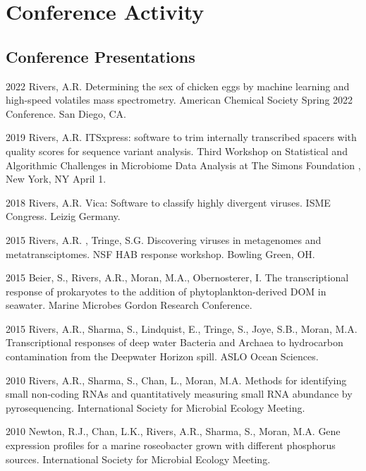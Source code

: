 \documentclass[12pt,letterpaper]{report}
\begin{document}
  
    \section*{Conference Activity}


    \subsection*{Conference Presentations}

    \begin{tablist}

    
\item[2022 ] \tab Rivers, A.R.  Determining the sex of chicken eggs by machine learning and high-speed volatiles mass spectrometry. American Chemical Society Spring 2022 Conference. San Diego, CA.
    	
\item[2019 ] \tab Rivers, A.R. ITSxpress: software to trim internally transcribed spacers with quality scores for sequence variant analysis. Third Workshop on Statistical and Algorithmic Challenges in Microbiome Data Analysis at The Simons Foundation , New York, NY April 1. 

\item[2018 ] \tab Rivers, A.R. Vica: Software to classify highly divergent viruses. ISME Congress. Leizig Germany.

\item[2015 ] \tab Rivers, A.R. , Tringe, S.G. Discovering viruses in metagenomes and metatransciptomes. NSF HAB response workshop. Bowling Green, OH.

\item[2015 ] \tab  Beier, S., Rivers, A.R., Moran, M.A., Obernosterer, I. The transcriptional response of prokaryotes to the addition of phytoplankton-derived DOM in seawater. Marine Microbes Gordon Research Conference. 

\item[2015] \tab Rivers, A.R., Sharma, S., Lindquist, E., Tringe, S., Joye, S.B., Moran, M.A.  Transcriptional responses of deep water Bacteria and Archaea to hydrocarbon contamination from the Deepwater Horizon spill. ASLO Ocean Sciences. 

\item[2010] \tab Rivers, A.R., Sharma, S., Chan, L., Moran, M.A. Methods for identifying small non-coding RNAs and quantitatively measuring small RNA abundance by pyrosequencing. International Society for Microbial Ecology Meeting.

\item[2010] \tab Newton, R.J., Chan, L.K., Rivers, A.R., Sharma, S., Moran, M.A.  Gene expression profiles for a marine roseobacter grown with different phosphorus sources. International Society for Microbial Ecology Meeting.


\end{tablist}
\end{document}
